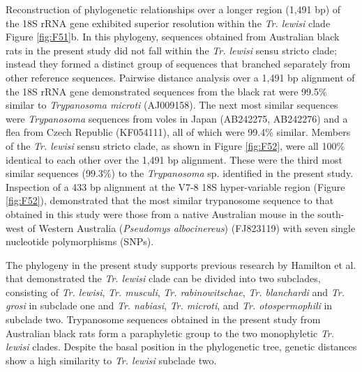 \documentclass[a4paper, nobind]{templates/ociamthesis}
\begin{document}
Reconstruction of phylogenetic relationships over a longer region (1,491 bp) of the 18S rRNA gene exhibited superior resolution within the \emph{Tr. lewisi} clade Figure \ref{fig:F51}b. In this phylogeny, sequences obtained from Australian black rats in the present study did not fall within the \emph{Tr. lewisi} sensu stricto clade; instead they formed a distinct group of sequences that branched separately from other reference sequences. Pairwise distance analysis over a 1,491 bp alignment of the 18S rRNA gene demonstrated sequences from the black rat were 99.5\% similar to \emph{Trypanosoma microti} (AJ009158). The next most similar sequences were \emph{Trypanosoma} sequences from voles in Japan (AB242275, AB242276) and a flea from Czech Republic (KF054111), all of which were 99.4\% similar. Members of the \emph{Tr. lewisi} sensu stricto clade, as shown in Figure \ref{fig:F52}, were all 100\% identical to each other over the 1,491 bp alignment. These were the third most similar sequences (99.3\%) to the \emph{Trypanosoma} sp. identified in the present study. Inspection of a 433 bp alignment at the V7-8 18S hyper-variable region (Figure \ref{fig:F52}), demonstrated that the most similar trypanosome sequence to that obtained in this study were those from a native Australian mouse in the south-west of Western Australia (\emph{Pseudomys albocinereus}) (FJ823119) with seven single nucleotide polymorphisms (SNPs).

The phylogeny in the present study supports previous research by Hamilton et al. \autocite*{hamiltonInadvertentIntroductionAustralia2005} that demonstrated the \emph{Tr. lewisi} clade can be divided into two subclades, consisting of \emph{Tr. lewisi}, \emph{Tr. musculi}, \emph{Tr. rabinowitschae}, \emph{Tr. blanchardi} and \emph{Tr. grosi} in subclade one and \emph{Tr. nabiasi}, \emph{Tr. microti}, and \emph{Tr. otospermophili} in subclade two. Trypanosome sequences obtained in the present study from Australian black rats form a paraphyletic group to the two monophyletic \emph{Tr. lewisi} clades. Despite the basal position in the phylogenetic tree, genetic distances show a high similarity to \emph{Tr. lewisi} subclade two.
\end{document}
